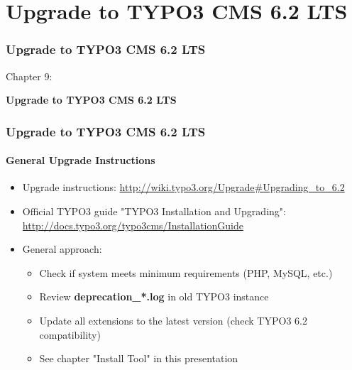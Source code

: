 %

\section{Upgrade to TYPO3 CMS 6.2 LTS}
\begin{frame}[fragile]
	\frametitle{Upgrade to TYPO3 CMS 6.2 LTS}

	\begin{center}\huge{Chapter 9:}\end{center}
	\begin{center}\huge{\color{typo3darkgrey}\textbf{Upgrade to TYPO3 CMS 6.2 LTS}}\end{center}

\end{frame}


\begin{frame}[fragile]
	\frametitle{Upgrade to TYPO3 CMS 6.2 LTS}
	\framesubtitle{General Upgrade Instructions}

	\begin{itemize}

		\item Upgrade instructions:\newline
			\smaller\url{http://wiki.typo3.org/Upgrade#Upgrading_to_6.2}\normalsize
		\item Official TYPO3 guide "TYPO3 Installation and Upgrading":
			\smaller\url{http://docs.typo3.org/typo3cms/InstallationGuide}\normalsize
		\item General approach:
			\begin{itemize}
				\item Check if system meets minimum requirements \small(PHP, MySQL, etc.)\normalsize
				\item Review \textbf{deprecation\_*.log} in old TYPO3 instance
				\item Update all extensions to the latest version\newline
					\small(check TYPO3 6.2 compatibility)\normalsize
				\item See chapter "Install Tool" in this presentation
			\end{itemize}
	\end{itemize}

\end{frame}

